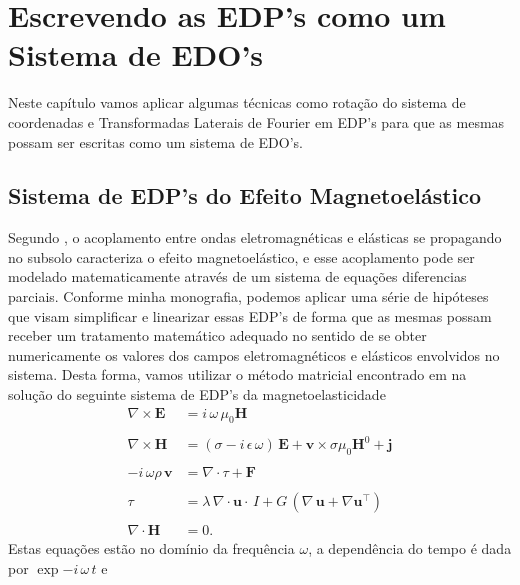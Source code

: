 \chapter{Escrevendo as EDP's como um Sistema de EDO's}
Neste cap\'itulo vamos aplicar algumas t\'ecnicas como rota\c{c}\~ao do sistema de coordenadas e Transformadas Laterais de Fourier em EDP's para que as mesmas possam ser escritas como um sistema de EDO's.

\section{Sistema de EDP's do Efeito Magnetoel\'astico}

Segundo \cite{eringen_1963}, o acoplamento entre ondas eletromagn\'eticas e el\'asticas se propagando no subsolo caracteriza o efeito magnetoel\'astico, e esse acoplamento pode ser modelado matematicamente atrav\'es de um sistema de equa\c{c}\~oes diferencias parciais. Conforme minha monografia, podemos aplicar uma s\'erie de hip\'oteses que visam simplificar e linearizar essas EDP's de forma que as mesmas possam receber um tratamento matem\'atico adequado no sentido de se obter numericamente os valores dos campos eletromagn\'eticos e el\'asticos envolvidos no sistema. Desta forma, vamos utilizar o m\'etodo matricial encontrado em \cite{Ursin-1983} na solu\c{c}\~ao do seguinte sistema de EDP's da magnetoelasticidade
\begin{align}\label{eq.mag_ela_1}
\nabla\times\mathbf{{E}}&=i\,\omega\,\mu_0\mathbf{{H}}\\\nonumber\\\label{eq.mag_ela_2}
\nabla\times\mathbf{{H}}&=(\sigma-i\,\epsilon\,\omega)\,\mathbf{{E}}+\mathbf{{v}}\times\sigma\mu_0\mathbf{H}^0+\mathbf{j}\\\nonumber\\\label{eq.mag_ela_3}
-i\,\omega\rho\,\mathbf{{v}}&=\nabla\cdot{\tau} + \mathbf{{F}}\\\nonumber\\\label{eq.mag_ela_4}
{\tau}&=\lambda\,\nabla\cdot\mathbf{{u}}\cdot\,I + G\,(\nabla\,\mathbf{{u}}+\nabla\mathbf{{u}}^\top)\\\nonumber\\\label{eq.mag_ela_5}
\nabla\cdot\mathbf{{H}}&=0.
\end{align}
Estas equa\c{c}\~oes est\~ao no dom\'inio da frequ\^encia $\omega$, a depend\^encia do tempo \'e dada por $\exp{-i\,\omega\,t}$ e 
